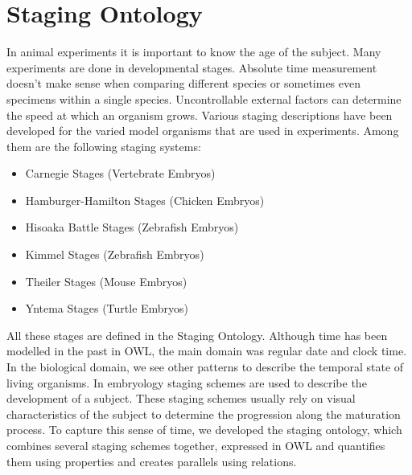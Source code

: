 \section{Staging Ontology}

In animal experiments it is important to
know the age of the subject. Many experiments are done in
developmental stages. Absolute time
measurement doesn't make sense when comparing different species or
sometimes even specimens within a single species. Uncontrollable
external factors can determine the speed at which an organism
grows. Various staging descriptions have been developed for the varied
model organisms that are used in experiments. Among them are the
following staging systems:

\begin{itemize}
\item Carnegie Stages\cite{CarnegieStage}
  (Vertebrate Embryos)
\item Hamburger-Hamilton
  Stages\cite{HamburgerHamiltonStage}
  (Chicken Embryos)
\item Hisoaka Battle
  Stages\cite{HisaokaBattleStage}
  (Zebrafish Embryos)
\item Kimmel Stages\cite{KimmelStage} (Zebrafish
  Embryos)
\item Theiler Stages\cite{TheilerStage} (Mouse
  Embryos)
\item Yntema Stages\cite{YntemaStage} (Turtle
  Embryos)
\end{itemize}

All these stages are defined in the Staging
Ontology. Although
time has been modelled in the past in OWL, the main domain was regular
date and clock time. In the biological domain, we see other patterns
to describe the temporal state of living organisms. In embryology
staging schemes are used to describe the development of a
subject. These staging schemes usually rely on visual characteristics
of the subject to determine the progression along the maturation
process. To capture this sense of time, we developed the staging
ontology, which combines several staging schemes together, expressed
in OWL and quantifies them using properties and creates parallels
using relations.



